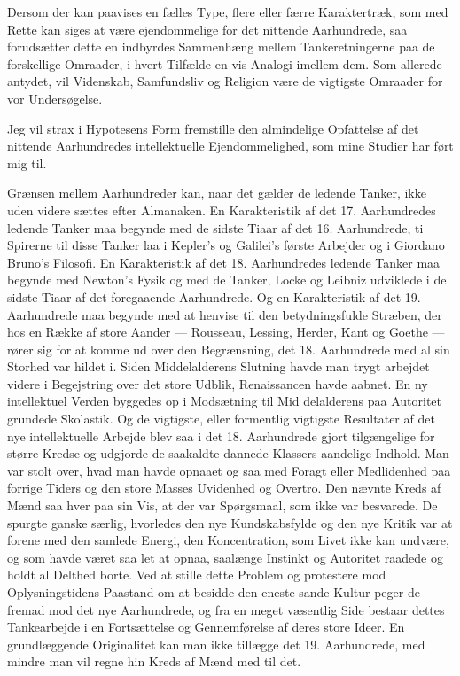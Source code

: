 \documentclass[12pt,a4paper,openany]{book}
\newcommand{\opage}[1]{\marginnote{\footnotesize\textit{[#1]}}}
\begin{document}
Dersom der kan paavises en fælles Type, flere eller færre Karaktertræk,
som med Rette kan siges at være ejendommelige for det
nittende Aarhundrede, saa forudsætter dette en indbyrdes Sammenhæng
mellem Tankeretningerne paa de forskellige Omraader, i hvert
Tilfælde en vis Analogi imellem dem. Som allerede antydet, vil Videnskab,
Samfundsliv og Religion være de vigtigste Omraader for
vor Undersøgelse.

Jeg vil strax i Hypotesens Form fremstille den almindelige Opfattelse
af det nittende Aarhundredes intellektuelle Ejendommelighed,
som mine Studier har ført mig til.

Grænsen mellem Aarhundreder kan, naar det gælder de ledende
Tanker, ikke uden videre sættes efter Almanaken. En Karakteristik
af det 17. Aarhundredes ledende Tanker maa begynde med de sidste
Tiaar af det 16. Aarhundrede, ti Spirerne til disse Tanker laa i
Kepler’s og Galilei’s første Arbejder og i Giordano Bruno’s Filosofi.
En Karakteristik af det 18. Aarhundredes ledende Tanker maa begynde
med Newton’s Fysik og med de Tanker, Locke og Leibniz udviklede
i de sidste Tiaar af det foregaaende Aarhundrede. Og en
Karakteristik af det 19. Aarhundrede maa begynde med at henvise
til den betydningsfulde Stræben, der hos en Række af store Aander
--- Rousseau, Lessing, Herder, Kant og Goethe --- rører sig for at komme
ud over den Begrænsning, det 18. Aarhundrede med al sin Storhed
var hildet i. Siden Middelalderens Slutning havde man trygt arbejdet
videre i Begejstring over det store Udblik, Renaissancen havde
aabnet. En ny intellektuel Verden byggedes op i Modsætning til Mid%
\opage{3}delalderens paa Autoritet grundede Skolastik. Og de vigtigste, eller
formentlig vigtigste Resultater af det nye intellektuelle Arbejde blev
saa i det 18. Aarhundrede gjort tilgængelige for større Kredse og udgjorde
de saakaldte dannede Klassers aandelige Indhold. Man var
stolt over, hvad man havde opnaaet og saa med Foragt eller Medlidenhed
paa forrige Tiders og den store Masses Uvidenhed og Overtro.
Den nævnte Kreds af Mænd saa hver paa sin Vis, at der var
Spørgsmaal, som ikke var besvarede. De spurgte ganske særlig, hvorledes
den nye Kundskabsfylde og den nye Kritik var at forene med
den samlede Energi, den Koncentration, som Livet ikke kan undvære,
og som havde været saa let at opnaa, saalænge Instinkt og
Autoritet raadede og holdt al Delthed borte. Ved at stille dette
Problem og protestere mod Oplysningstidens Paastand om at besidde
den eneste sande Kultur peger de fremad mod det nye Aarhundrede,
og fra en meget væsentlig Side bestaar dettes Tankearbejde i en Fortsættelse
og Gennemførelse af deres store Ideer. En grundlæggende
Originalitet kan man ikke tillægge det 19. Aarhundrede, med mindre
man vil regne hin Kreds af Mænd med til det.
\end{document}
